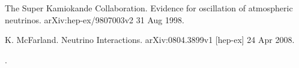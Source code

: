 \documentclass[11pt]{article}
\begin{document}
\newpage

\begin{thebibliography}{1}

     The Super Kamiokande Collaboration. Evidence for oscillation of atmospheric neutrinos. arXiv:hep-ex/9807003v2 31 Aug 1998.

     K. McFarland. Neutrino Interactions. arXiv:0804.3899v1 [hep-ex] 24 Apr 2008.

\end{thebibliography}

\clearpage
\newpage
.
\thispagestyle{empty}
\newpage
\end{document}
